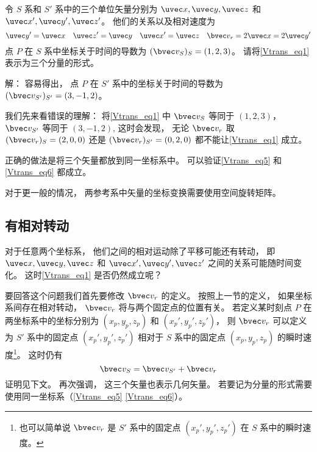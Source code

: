 \begin{example}{}\label{Vtrans_ex2}
令 $S$ 系和 $S'$ 系中的三个单位矢量分别为 $\uvec x, \uvec y, \uvec z$ 和 $\uvec x', \uvec y', \uvec z'$。 他们的关系以及相对速度为
\begin{equation}
\uvec y' = \uvec x\quad
\uvec z' = \uvec y\quad
\uvec x' = \uvec z\quad
\bvec v_r = 2\uvec x = 2\uvec y'
\end{equation}
点 $P$ 在 $S$ 系中坐标关于时间的导数为 $(\bvec v_S)_S = (1, 2, 3)$。 请将\autoref{Vtrans_eq1} 表示为三个分量的形式。

解： 容易得出， 点 $P$ 在 $S'$ 系中的坐标关于时间的导数为 $(\bvec v_{S'})_{S'} = (3, -1, 2)$。

我们先来看错误的理解： 将\autoref{Vtrans_eq1} 中 $\bvec v_S$ 等同于 $(1, 2, 3)$， $\bvec v_{S'}$ 等同于 $(3, -1, 2)$,  这时会发现， 无论 $\bvec v_r$ 取 $(\bvec v_r)_S = (2, 0, 0)$ 还是 $(\bvec v_r)_{S'} = (0, 2, 0)$ 都不能让\autoref{Vtrans_eq1} 成立。

正确的做法是将三个矢量都放到同一坐标系中。 可以验证\autoref{Vtrans_eq5} 和\autoref{Vtrans_eq6} 都成立。
\end{example}

对于更一般的情况， 两参考系中矢量的坐标变换需要使用空间旋转矩阵。

\subsection{有相对转动}
对于任意两个坐标系， 他们之间的相对运动除了平移可能还有转动， 即 $\uvec x, \uvec y, \uvec z$ 和 $\uvec x', \uvec y', \uvec z'$ 之间的关系可能随时间变化。 这时\autoref{Vtrans_eq1} 是否仍然成立呢？

要回答这个问题我们首先要修改 $\bvec v_r$ 的定义。 按照上一节的定义， 如果坐标系间存在相对转动， $\bvec v_r$ 将与两个固定点的位置有关。 若定义某时刻点 $P$ 在两坐标系中的坐标分别为 $(x_p, y_p, z_p)$ 和 $(x_p', y_p', z_p')$， 则 $\bvec v_r$ 可以定义为 $S'$ 系中的固定点 $(x_p', y_p', z_p')$ 相对于 $S$ 系中的固定点 $(x_p, y_p, z_p)$ 的瞬时速度\footnote{也可以简单说 $\bvec v_r$ 是 $S'$ 系中的固定点 $(x_p', y_p', z_p')$ 在 $S$ 系中的瞬时速度。}。 这时仍有
\begin{equation}\label{Vtrans_eq2}
\bvec v_{S} = \bvec v_{S'} + \bvec v_r
\end{equation}
证明见下文。 再次强调， 这三个矢量也表示几何矢量。 若要记为分量的形式需要使用同一坐标系（\autoref{Vtrans_eq5} \autoref{Vtrans_eq6}）。

